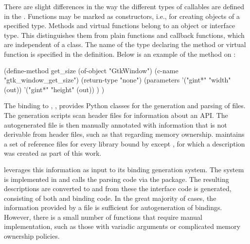 \documentclass[article,shortnames]{jss}
\begin{document}
There are slight differences in the way the different types of
callables are defined in the . Functions may be marked
as constructors, i.e., for creating objects of a specified type.
Methods and virtual functions belong to an object or interface type.
This distinguishes them from plain functions and callback functions,
which are independent of a class. The name of the type declaring the
method or virtual function is specified in the definition.
Below is an
example of the  method on :
\begin{Code}
(define-method get_size
  (of-object "GtkWindow")
  (c-name "gtk_window_get_size")
  (return-type "none")
  (parameters
    '("gint*" "width" (out))
    '("gint*" "height" (out))
  )
)
\end{Code}


The  binding to ,
 \citep{PyGTK}, provides Python classes for the generation
and 
parsing of  files. The generation scripts scan
header 
files for information about an API. The autogenerated 
file
is then 
manually annotated with information that is not derivable from header
files, such as that
regarding memory ownership.  maintains a set of reference
 files
for every library bound by  except , for which a
description was created as part of this work.

 leverages this information as input to its binding
generation system.  The system is implemented in  and
calls the   parsing code via the
\citep{RSPython} package.  The resulting descriptions are converted to
 and from these the interface code is generated,
consisting of both  and  binding code. In the
great majority of cases, the information provided by a 
file is sufficient for autogeneration of bindings.  However, there is
a small number of functions that require manual implementation, such
as those with variadic arguments or complicated memory ownership
policies.
\end{document}
